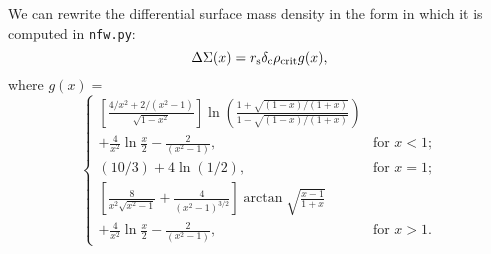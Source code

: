 \documentclass{emulateapj}
\newcommand{\code}{\lstinline[style=codeintext]}
\begin{document}
We can rewrite the differential surface mass density in the form in which it is computed in \code{nfw.py}:
\begin{equation}
     \Delta\Sigma(x) = r_{\rm s} \delta_{\rm c} \rho_{\rm crit} g(x),
\end{equation}
where  $g(x) = $
\begin{equation}
    \begin{cases}

    \left[ \frac{4 / x^2 + 2/ (x^2 - 1)}{\sqrt{1 - x^2}} \right] \ln \left( \frac{1 + \sqrt{(1-x) / (1+x)} }{1 - \sqrt{(1-x) / (1+x)} } \right) \\ + \frac{4}{x^2} \ln \frac{x}{2} - \frac{2}{(x^2 - 1)}, & \text{for } x < 1; \\
    
    (10/3) + 4 \ln(1/2), & \text{for } x = 1; \\
    
    \left[ \frac{8}{x^2 \sqrt{x^2 - 1}} + \frac{4}{(x^2 - 1)^{3/2}} \right] \arctan\sqrt{\frac{x-1}{1+x}} \\ + \frac{4}{x^2} \ln \frac{x}{2} - \frac{2}{(x^2 - 1)}, & \text{for } x > 1.

    \end{cases}
\end{equation}

\end{document}
